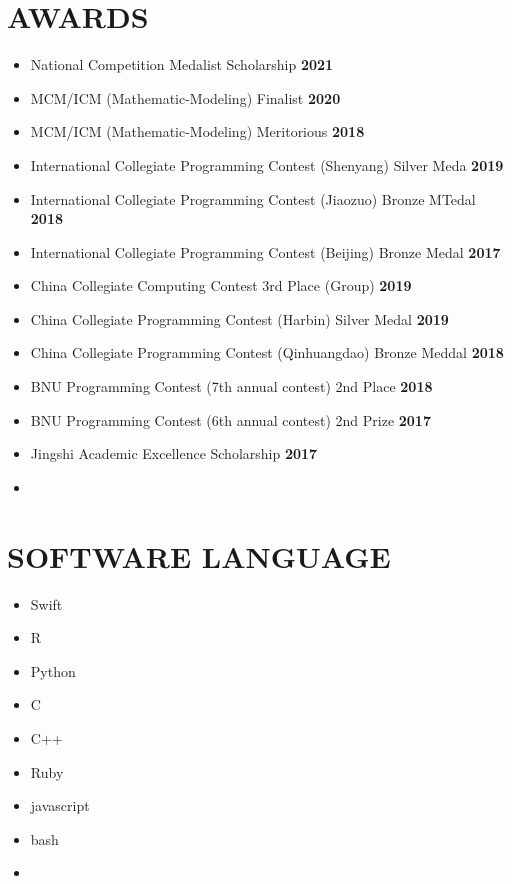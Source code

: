 \documentclass[a4paper,12pt]{article}
\begin{document}
\hfill
\section{\textbf{AWARDS}}
\begin{minipage}[t]{\linewidth}
\begin{itemize}[nosep,after=\strut, leftmargin=1em, itemsep=2pt]
    \item National Competition Medalist Scholarship \hfill \textbf{2021}
    \item MCM/ICM (Mathematic-Modeling) Finalist \hfill \textbf{2020}
    \item MCM/ICM (Mathematic-Modeling) Meritorious \hfill \textbf{2018}
    \item International Collegiate Programming Contest (Shenyang) Silver Meda  \hfill \textbf{2019}
    \item International Collegiate Programming Contest (Jiaozuo) Bronze MTedal \hfill \textbf{2018} 
    \item International Collegiate Programming Contest (Beijing) Bronze Medal \hfill \textbf{2017} 
    \item China Collegiate Computing Contest 3rd Place (Group) \hfill \textbf{2019}
    \item China Collegiate Programming Contest (Harbin) Silver Medal \hfill \textbf{2019} 
    \item China Collegiate Programming Contest (Qinhuangdao) Bronze Meddal \hfill \textbf{2018} 
    \item BNU Programming Contest (7th annual contest) 2nd Place \hfill \textbf{2018} 
    \item BNU Programming Contest (6th annual contest) 2nd Prize \hfill \textbf{2017}
    \item Jingshi Academic Excellence Scholarship \hfill \textbf{2017}
    \item[] 
\end{itemize}
\end{minipage}

\section{\textbf{SOFTWARE LANGUAGE}}
\begin{minipage}[t]{\linewidth}
\begin{itemize}[nosep,after=\strut, leftmargin=1em, itemsep=2pt]
    \item Swift
    \item R
    \item Python
    \item C
    \item C++
    \item Ruby
    \item javascript
    \item bash
    \item[] 
\end{itemize}
\end{minipage}
\end{document}
